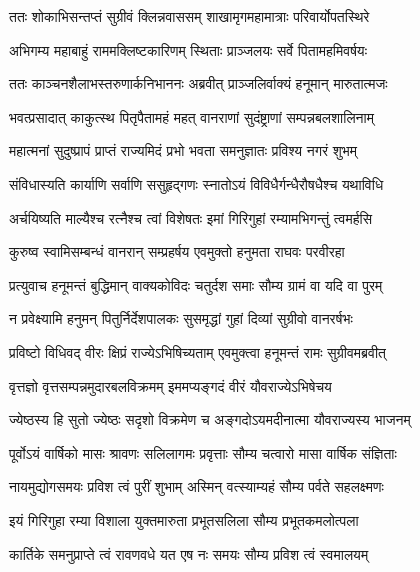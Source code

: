 
\twolineshloka
{ततः शोकाभिसन्तप्तं सुग्रीवं क्लिन्नवाससम्}
{शाखामृगमहामात्राः परिवार्योपतस्थिरे} %

\twolineshloka
{अभिगम्य महाबाहुं राममक्लिष्टकारिणम्}
{स्थिताः प्राञ्जलयः सर्वे पितामहमिवर्षयः} %

\twolineshloka
{ततः काञ्चनशैलाभस्तरुणार्कनिभाननः}
{अब्रवीत् प्राञ्जलिर्वाक्यं हनूमान् मारुतात्मजः} %

\twolineshloka
{भवत्प्रसादात् काकुत्स्थ पितृपैतामहं महत्}
{वानराणां सुदंष्ट्राणां सम्पन्नबलशालिनाम्} %

\twolineshloka
{महात्मनां सुदुष्प्रापं प्राप्तं राज्यमिदं प्रभो}
{भवता समनुज्ञातः प्रविश्य नगरं शुभम्} %

\twolineshloka
{संविधास्यति कार्याणि सर्वाणि ससुहृद्गणः}
{स्नातोऽयं विविधैर्गन्धैरौषधैश्च यथाविधि} %

\twolineshloka
{अर्चयिष्यति माल्यैश्च रत्नैश्च त्वां विशेषतः}
{इमां गिरिगुहां रम्यामभिगन्तुं त्वमर्हसि} %

\twolineshloka
{कुरुष्व स्वामिसम्बन्धं वानरान् सम्प्रहर्षय}
{एवमुक्तो हनुमता राघवः परवीरहा} %

\twolineshloka
{प्रत्युवाच हनूमन्तं बुद्धिमान् वाक्यकोविदः}
{चतुर्दश समाः सौम्य ग्रामं वा यदि वा पुरम्} %

\twolineshloka
{न प्रवेक्ष्यामि हनुमन् पितुर्निर्देशपालकः}
{सुसमृद्धां गुहां दिव्यां सुग्रीवो वानरर्षभः} %

\twolineshloka
{प्रविष्टो विधिवद् वीरः क्षिप्रं राज्येऽभिषिच्यताम्}
{एवमुक्त्वा हनूमन्तं रामः सुग्रीवमब्रवीत्} %

\twolineshloka
{वृत्तज्ञो वृत्तसम्पन्नमुदारबलविक्रमम्}
{इममप्यङ्गदं वीरं यौवराज्येऽभिषेचय} %

\twolineshloka
{ज्येष्ठस्य हि सुतो ज्येष्ठः सदृशो विक्रमेण च}
{अङ्गदोऽयमदीनात्मा यौवराज्यस्य भाजनम्} %

\twolineshloka
{पूर्वोऽयं वार्षिको मासः श्रावणः सलिलागमः}
{प्रवृत्ताः सौम्य चत्वारो मासा वार्षिक संज्ञिताः} %

\twolineshloka
{नायमुद्योगसमयः प्रविश त्वं पुरीं शुभाम्}
{अस्मिन् वत्स्याम्यहं सौम्य पर्वते सहलक्ष्मणः} %

\twolineshloka
{इयं गिरिगुहा रम्या विशाला युक्तमारुता}
{प्रभूतसलिला सौम्य प्रभूतकमलोत्पला} %

\twolineshloka
{कार्तिके समनुप्राप्ते त्वं रावणवधे यत}
{एष नः समयः सौम्य प्रविश त्वं स्वमालयम्} %


